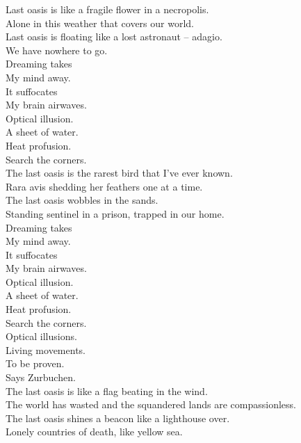 Last oasis is like a fragile flower in a necropolis. \\
Alone in this weather that covers our world. \\
Last oasis is floating like a lost astronaut -- adagio. \\
We have nowhere to go. \\

Dreaming takes \\
My mind away. \\
It suffocates \\
My brain airwaves. \\

Optical illusion. \\
A sheet of water. \\
Heat profusion. \\
Search the corners. \\

The last oasis is the rarest bird that I've ever known. \\
Rara avis shedding her feathers one at a time. \\
The last oasis wobbles in the  sands. \\
Standing sentinel in a prison, trapped in our home. \\

Dreaming takes \\
My mind away. \\
It suffocates \\
My brain airwaves. \\

Optical illusion. \\
A sheet of water. \\
Heat profusion. \\
Search the corners. \\

Optical illusions. \\
Living movements. \\
To be proven. \\
Says Zurbuchen. \\

The last oasis is like a flag beating in the wind. \\
The world has wasted and the squandered lands are compassionless. \\
The last oasis shines a beacon like a lighthouse over. \\
Lonely countries of death, like yellow sea. \\

